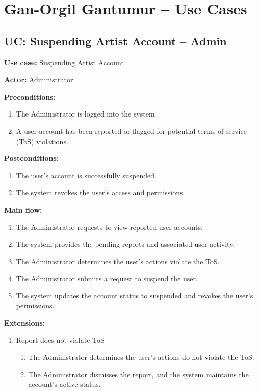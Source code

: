 \documentclass[11pt]{report}
\begin{document}
\section{{Gan-Orgil Gantumur} -- Use Cases}

\subsection{UC: Suspending Artist Account -- Admin}

{\bfseries Use case:} Suspending Artist Account

{\bfseries Actor:} Administrator

{\bfseries Preconditions:}
\begin{enumerate}
	\item The Administrator is logged into the system.
	\item A user account has been reported or flagged for potential terms of service (ToS) violations.
\end{enumerate}

{\bfseries Postconditions:}
\begin{enumerate}
	\item The user's account is successfully suspended.
	\item The system revokes the user's access and permissions.
\end{enumerate}

{\bfseries Main flow:}
\begin{enumerate}
	\item The Administrator requests to view reported user accounts.
	\item The system provides the pending reports and associated user activity.
	\item The Administrator determines the user's actions violate the ToS.
	\item The Administrator submits a request to suspend the user.
	\item The system updates the account status to suspended and revokes the user's permissions.
\end{enumerate}

{\bfseries Extensions:}
\begin{enumerate}
	\item [3a.] Report does not violate ToS
	\begin{enumerate}
		\item [3a1.] The Administrator determines the user's actions do not violate the ToS.
		\item [3a2.] The Administrator dismisses the report, and the system maintains the account's active status.
	\end{enumerate}
\end{enumerate}
\end{document}
